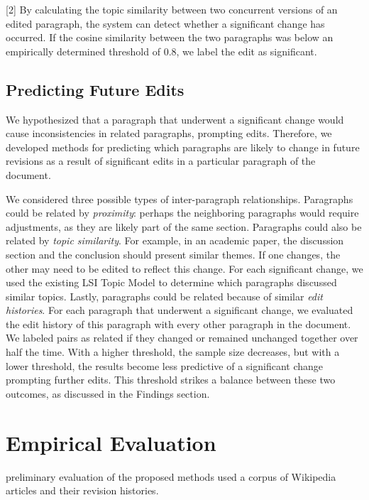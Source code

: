 {[}2{]} By calculating the topic similarity between two concurrent
versions of an edited paragraph, the system can detect whether a
significant change has occurred. If the cosine similarity between the
two paragraphs was below an empirically determined threshold of 0.8, we
label the edit as significant.

\subsection{Predicting Future Edits}\label{predicting-future-edits}

We hypothesized that a paragraph that underwent a significant change
would cause inconsistencies in related paragraphs, prompting edits.
Therefore, we developed methods for predicting which paragraphs are
likely to change in future revisions as a result of significant edits in
a particular paragraph of the document.

We considered three possible types of inter-paragraph relationships.
Paragraphs could be related by \emph{proximity}: perhaps the neighboring
paragraphs would require adjustments, as they are likely part of the
same section. Paragraphs could also be related by \emph{topic
similarity}. For example, in an academic paper, the discussion section
and the conclusion should present similar themes. If one changes, the
other may need to be edited to reflect this change. For each significant
change, we used the existing LSI Topic Model to determine which
paragraphs discussed similar topics. Lastly, paragraphs could be related
because of similar \emph{edit histories}. For each paragraph that
underwent a significant change, we evaluated the edit history of this
paragraph with every other paragraph in the document. We labeled pairs
as related if they changed or remained unchanged together over half the
time. With a higher threshold, the sample size decreases, but with a
lower threshold, the results become less predictive of a significant
change prompting further edits. This threshold strikes a balance between
these two outcomes, as discussed in the Findings section.

\section{Empirical Evaluation}\label{empirical-evaluation}

preliminary evaluation of the proposed methods used a corpus of
Wikipedia articles and their revision histories.

